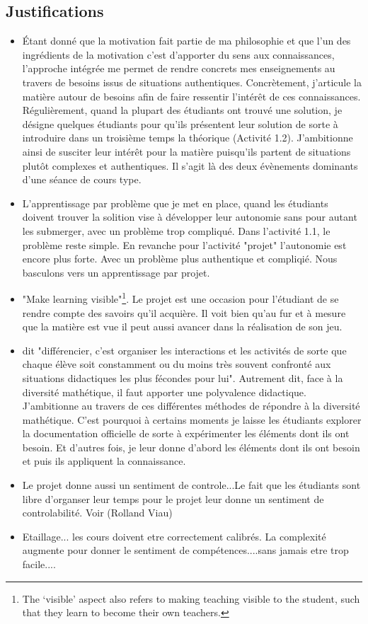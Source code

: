 \subsection{Justifications}
\begin{itemize}
    \item Étant donné que la motivation fait partie de ma philosophie et que l’un des ingrédients de la motivation c’est d’apporter du sens aux connaissances, l’approche intégrée me permet de rendre concrets mes enseignements au travers de besoins issus de situations authentiques. Concrètement, j'articule la matière autour de besoins afin de faire ressentir l'intérêt de ces connaissances. Régulièrement, quand la plupart des étudiants ont trouvé une solution, je désigne quelques étudiants pour qu’ils présentent leur solution de sorte à introduire dans un troisième temps la théorique (Activité 1.2). J’ambitionne ainsi de susciter leur intérêt pour la matière puisqu’ils partent de situations plutôt complexes et authentiques. Il s’agit là des deux évènements dominants d’une séance de cours type.
    \item L'apprentissage par problème que je met en place, quand les étudiants doivent trouver la solition vise à développer leur autonomie sans pour autant les submerger, avec un problème trop compliqué. Dans l’activité 1.1, le problème reste simple. En revanche pour l'activité "projet" l’autonomie est encore plus forte. Avec un problème plus authentique et compliqié. Nous basculons vers un apprentissage par projet.
    \item "Make learning visible"\footnote{The ‘visible’ aspect also refers to making teaching visible to the student, such that they learn to become their own teachers.}\cite{hattie2012visible}. Le projet est une occasion pour l'étudiant de se rendre compte des savoirs qu'il acquière. Il voit bien qu'au fur et à mesure que la matière est vue il peut aussi avancer dans la réalisation de son jeu.
    \item \cite{perrenoud1992differenciation} dit "différencier, c’est organiser les interactions et les activités de sorte que chaque élève soit constamment ou du moins très souvent confronté aux situations didactiques les plus fécondes pour lui". Autrement dit, face à la diversité mathétique, il faut apporter une polyvalence didactique. J’ambitionne au travers de ces différentes méthodes de répondre à la diversité mathétique. C’est pourquoi à certains moments je laisse les étudiants explorer la documentation officielle de sorte à expérimenter les éléments dont ils ont besoin. Et d’autres fois, je leur donne d’abord les éléments dont ils ont besoin et puis ils appliquent la connaissance.
    \item Le projet donne aussi un sentiment de controle...Le fait que les étudiants sont libre d'organser leur temps pour le projet leur donne un sentiment de controlabilité. Voir (Rolland Viau)
    \item Etaillage... les cours doivent etre correctement calibrés. La complexité augmente pour donner le sentiment de compétences....sans jamais etre trop facile....

\end{itemize}
\clearpage

